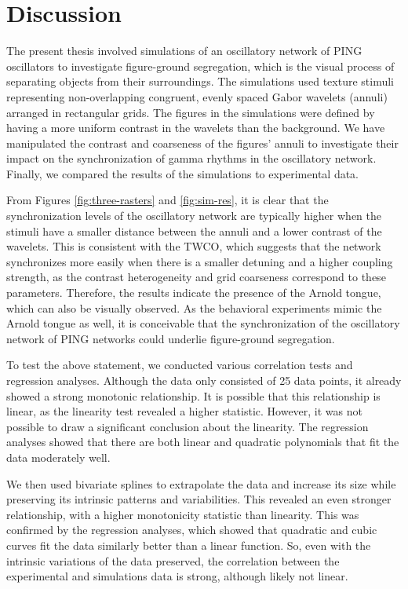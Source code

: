 \section{Discussion}

The present thesis involved simulations of an oscillatory network of PING oscillators to investigate figure-ground segregation, which is the visual process of separating objects from their surroundings. The simulations used texture stimuli representing non-overlapping congruent, evenly spaced Gabor wavelets (annuli) arranged in rectangular grids. The figures in the simulations were defined by having a more uniform contrast in the wavelets than the background. We have manipulated the contrast and coarseness of the figures' annuli to investigate their impact on the synchronization of gamma rhythms in the oscillatory network. Finally, we compared the results of the simulations to experimental data.

From Figures \ref{fig:three-rasters} and \ref{fig:sim-res}, it is clear that the synchronization levels of the oscillatory network are typically higher when the stimuli have a smaller distance between the annuli and a lower contrast of the wavelets. This is consistent with the TWCO, which suggests that the network synchronizes more easily when there is a smaller detuning and a higher coupling strength, as the contrast heterogeneity and grid coarseness correspond to these parameters. Therefore, the results indicate the presence of the Arnold tongue, which can also be visually observed.
As the behavioral experiments mimic the Arnold tongue as well, it is conceivable that the synchronization of the oscillatory network of PING networks could underlie figure-ground segregation.

To test the above statement, we conducted various correlation tests and regression analyses. Although the data only consisted of 25 data points, it already showed a strong monotonic relationship. It is possible that this relationship is linear, as the linearity test revealed a higher statistic. However, it was not possible to draw a significant conclusion about the linearity.
The regression analyses showed that there are both linear and quadratic polynomials that fit the data moderately well. 

We then used bivariate splines to extrapolate the data and increase its size while preserving its intrinsic patterns and variabilities. This revealed an even stronger relationship, with a higher monotonicity statistic than linearity. This was confirmed by the regression analyses, which showed that quadratic and cubic curves fit the data similarly better than a linear function. So, even with the intrinsic variations of the data preserved, the correlation between the experimental and simulations data is strong, although likely not linear.

